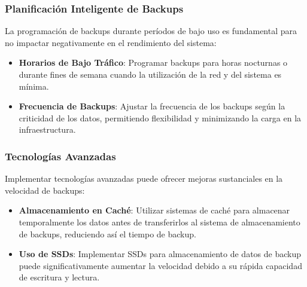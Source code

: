 \subsubsection{Planificación Inteligente de Backups}

La programación de backups durante períodos de bajo uso es fundamental para no impactar negativamente en el rendimiento del sistema:

\begin{itemize}
    \item \textbf{Horarios de Bajo Tráfico}: Programar backups para horas nocturnas o durante fines de semana cuando la utilización de la red y del sistema es mínima.
    \item \textbf{Frecuencia de Backups}: Ajustar la frecuencia de los backups según la criticidad de los datos, permitiendo flexibilidad y minimizando la carga en la infraestructura.
\end{itemize}

\subsubsection{Tecnologías Avanzadas}

Implementar tecnologías avanzadas puede ofrecer mejoras sustanciales en la velocidad de backups:

\begin{itemize}
    \item \textbf{Almacenamiento en Caché}: Utilizar sistemas de caché para almacenar temporalmente los datos antes de transferirlos al sistema de almacenamiento de backups, reduciendo así el tiempo de backup.
    \item \textbf{Uso de SSDs}: Implementar SSDs para almacenamiento de datos de backup puede significativamente aumentar la velocidad debido a su rápida capacidad de escritura y lectura.
\end{itemize}


